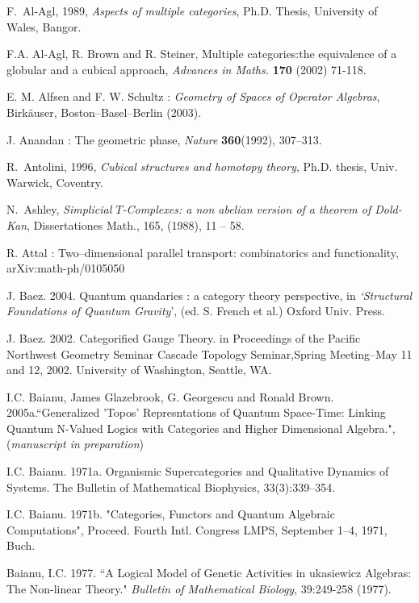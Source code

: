 \documentclass[12pt]{article}
\theoremstyle{plain}
\theoremstyle{definition}
\numberwithin{equation}{section}
\begin{document}
\begin{thebibliography}{99}

F.~Al-Agl, 1989, {\em Aspects of multiple categories\/}, Ph.D. Thesis, University of Wales, Bangor.

F.A. Al-Agl, R. Brown and R. Steiner, Multiple categories:the equivalence of a globular and a cubical approach, 
{\em Advances in Maths.} {\bf 170} (2002) 71-118.

E. M. Alfsen and F. W. Schultz : \emph{Geometry of Spaces of Operator Algebras}, Birk\"auser, Boston--Basel--Berlin (2003).

J. Anandan : The geometric phase, \emph{Nature} \textbf{360}(1992), 307--313.

R.~Antolini, 1996, {\em Cubical structures and homotopy theory\/},
Ph.D. thesis, Univ. Warwick, Coventry.

N.~Ashley, {\em Simplicial $T$-Complexes: a non abelian version of a theorem of Dold-Kan},
Dissertationes Math., 165, (1988), 11 -- 58.

R. Attal : Two--dimensional parallel transport: combinatorics and functionality, arXiv:math-ph/0105050

J. Baez. 2004. Quantum quandaries : a category theory perspective, in \emph{`Structural
Foundations of Quantum Gravity}', (ed. S. French et al.) Oxford Univ. Press.

J. Baez. 2002. Categorified Gauge Theory. in Proceedings of the Pacific Northwest Geometry
Seminar Cascade Topology Seminar,Spring Meeting--May 11 and 12, 2002. University of 
Washington, Seattle, WA.

I.C. Baianu, James Glazebrook, G. Georgescu and Ronald Brown. 2005a.``Generalized 'Topos' 
Represntations of Quantum Space-Time: Linking Quantum N-Valued Logics with Categories and 
Higher Dimensional Algebra.", (\emph{manuscript in preparation})

I.C. Baianu. 1971a. Organismic Supercategories and Qualitative Dynamics of Systems. The 
Bulletin of Mathematical Biophysics, 33(3):339--354.

I.C. Baianu. 1971b. "Categories, Functors and Quantum Algebraic Computations", Proceed. Fourth 
Intl. Congress LMPS, September 1--4, 1971, Buch.

Baianu, I.C. 1977. ``A Logical Model of Genetic Activities in \Textsl{\L}ukasiewicz Algebras: 
The Non-linear Theory." \emph{Bulletin of Mathematical Biology}, 39:249-258 (1977).


\end{thebibliography}
\end{document}
